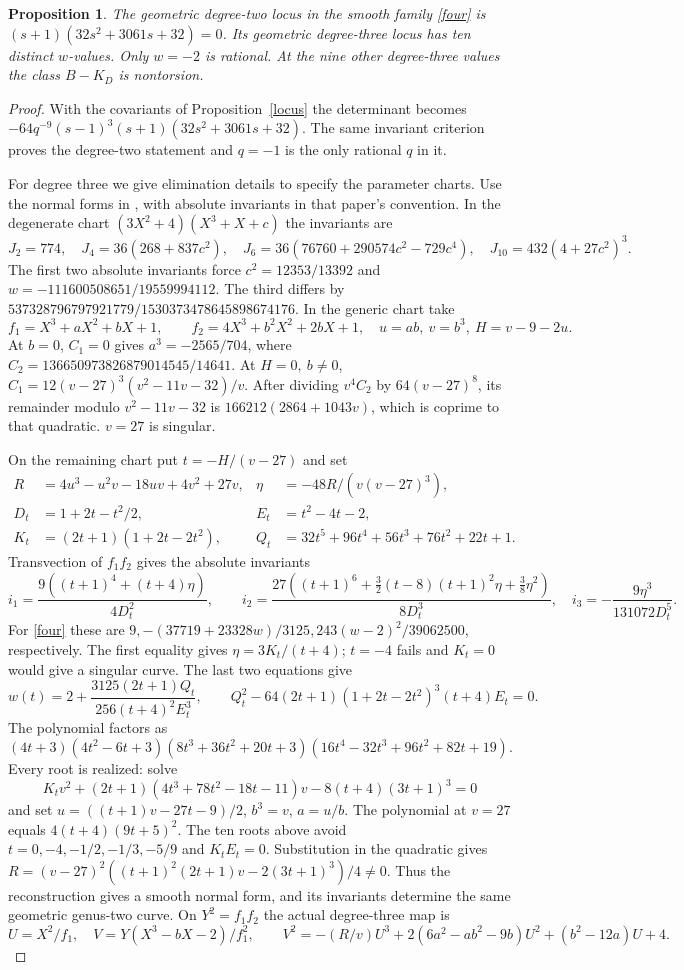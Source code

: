 \documentclass[11pt]{article}
\newtheorem{proposition}[theorem]{Proposition}
\begin{document}
\begin{proposition}
The geometric degree-two locus in the smooth family \eqref{four}
is $(s+1)(32s^2+3061s+32)=0$. Its geometric degree-three locus
has ten distinct $w$-values. Only $w=-2$ is rational. At the nine
other degree-three values the class $B-K_D$ is nontorsion.
\end{proposition}
\begin{proof}
With the covariants of Proposition~\ref{locus} the determinant becomes
$-64q^{-9}(s-1)^3(s+1)(32s^2+3061s+32)$. The same invariant criterion
proves the degree-two statement and $q=-1$ is the only rational $q$ in it.

For degree three we give elimination details to specify the parameter
charts. Use the normal forms in \cite{Shaska}, with absolute invariants
in that paper's convention. In the degenerate chart
$(3X^2+4)(X^3+X+c)$ the invariants are
\[
 J_2=774,\quad J_4=36(268+837c^2),\quad
 J_6=36(76760+290574c^2-729c^4),\quad J_{10}=432(4+27c^2)^3.
\]
The first two absolute invariants force $c^2=12353/13392$ and
$w=-111600508651/19559994112$. The third differs by
$537328796797921779/1530373478645898674176$.
In the generic chart take
\[
 f_1=X^3+aX^2+bX+1,\qquad f_2=4X^3+b^2X^2+2bX+1,\quad
 u=ab,\ v=b^3,\ H=v-9-2u .
\]
At $b=0$, $C_1=0$ gives $a^3=-2565/704$, where
$C_2=136650973826879014545/14641$. At $H=0,\ b\ne0$,
$C_1=12(v-27)^3(v^2-11v-32)/v$.
After dividing $v^4 C_2$ by $64(v-27)^8$, its remainder modulo
$v^2-11v-32$ is $166212(2864+1043v)$, which is coprime to that
quadratic. $v=27$ is singular.

On the remaining chart put $t=-H/(v-27)$ and set
\begin{align*}
 R&=4u^3-u^2v-18uv+4v^2+27v,&
 \eta&=-48R/(v(v-27)^3),\\
 D_t&=1+2t-t^2/2,& E_t&=t^2-4t-2,\\
 K_t&=(2t+1)(1+2t-2t^2),&
 Q_t&=32t^5+96t^4+56t^3+76t^2+22t+1 .
\end{align*}
Transvection of $f_1f_2$ gives the absolute invariants
\[
 i_1=\frac{9((t+1)^4+(t+4)\eta)}{4D_t^2},\qquad
 i_2=\frac{27((t+1)^6+\tfrac32(t-8)(t+1)^2\eta+\tfrac38\eta^2)}{8D_t^3},
 \quad i_3=-\frac{9\eta^3}{131072D_t^5}.
\]
For \eqref{four} these are
$9,-(37719+23328w)/3125,243(w-2)^2/39062500$, respectively.
The first equality gives $\eta=3K_t/(t+4)$; $t=-4$ fails and
$K_t=0$ would give a singular curve. The last two equations give
\[
 w(t)=2+\frac{3125(2t+1)Q_t}{256(t+4)^2E_t^3},\qquad
 Q_t^2-64(2t+1)(1+2t-2t^2)^3(t+4)E_t=0.
\]
The polynomial factors as
\[
 (4t+3)(4t^2-6t+3)(8t^3+36t^2+20t+3)
 (16t^4-32t^3+96t^2+82t+19).
\]
Every root is realized: solve
\[
 K_t v^2+(2t+1)(4t^3+78t^2-18t-11)v-8(t+4)(3t+1)^3=0
\]
and set $u=((t+1)v-27t-9)/2$, $b^3=v$, $a=u/b$.
The polynomial at $v=27$ equals $4(t+4)(9t+5)^2$.
The ten roots above avoid $t=0,-4,-1/2,-1/3,-5/9$ and
$K_tE_t=0$. Substitution in the quadratic gives
$R=(v-27)^2((t+1)^2(2t+1)v-2(3t+1)^3)/4\ne0$.
Thus the reconstruction gives a smooth normal form, and its
invariants determine the same geometric genus-two curve.
On $Y^2=f_1f_2$ the actual degree-three map is
\[
 U=X^2/f_1,\quad V=Y(X^3-bX-2)/f_1^2,\qquad
 V^2=-(R/v)U^3+2(6a^2-ab^2-9b)U^2+(b^2-12a)U+4.
\]


\end{proof}
\end{document}
